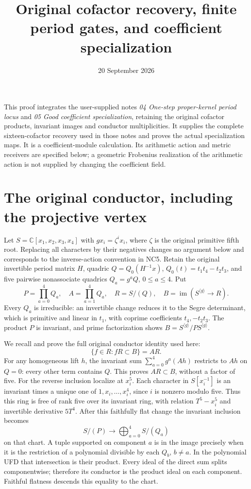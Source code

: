 \documentclass[11pt]{article}
\title{Original cofactor recovery, finite period gates, and coefficient specialization}
\author{}
\date{20 September 2026}
\newcommand{\C}{\mathbb C}
\newcommand{\im}{\operatorname{im}}
\begin{document}
\maketitle
This proof integrates the user-supplied notes
\emph{04 One-step proper-kernel period locus} and
\emph{05 Good coefficient specialization}, retaining the original
cofactor products, invariant images and conductor multiplicities.
It supplies the complete sixteen-cofactor recovery used in those notes
and proves the actual specialization maps. It is a coefficient-module
calculation. Its arithmetic action and metric receivers are specified
below; a geometric Frobenius realization of the arithmetic action is
not supplied by changing the coefficient field.

\section{The original conductor, including the projective vertex}
Let $S=\C[x_1,x_2,x_3,x_4]$ with
$g x_i=\zeta^i x_i$, where $\zeta$ is the original primitive fifth
root. Replacing all characters by their negatives changes no argument
below and corresponds to the inverse-action convention in NC5.
Retain the original invertible period matrix $H$, quadric
$Q=Q_0(H^{-1}x)$, $Q_0(t)=t_1t_4-t_2t_3$, and five pairwise
nonassociate quadrics $Q_a=g^aQ$, $0\le a\le4$. Put
\[
 P=\prod_{a=0}^4Q_a,\quad A=\prod_{a=1}^4Q_a,\quad
 R=S/(Q),\quad B=\im(S^{\langle g\rangle}\to R).
                                                                    \tag{CP1}
\]
Every $Q_a$ is irreducible: an invertible change reduces it to the
Segre determinant, which is primitive and linear in $t_1$, with
coprime coefficients $t_4,-t_2t_3$. The product $P$ is invariant,
and prime factorization shows
$B=S^{\langle g\rangle}/P S^{\langle g\rangle}$.

We recall and prove the full original conductor identity used here:
\[
 \{f\in R:fR\subset B\}=AR.                                      \tag{CP2}
\]
For any homogeneous lift $h$, the invariant sum
$\sum_{a=0}^4g^a(Ah)$ restricts to $Ah$ on $Q=0$: every other
term contains $Q$. This proves $AR\subset B$, without a factor
of five. For the reverse inclusion localize at $x_i^5$. Each
character in $S[x_i^{-1}]$ is an invariant times a unique one
of $1,x_i,\ldots,x_i^4$, since $i$ is nonzero modulo five.
Thus this ring is free of rank five over its invariant ring,
with relation $T^5-x_i^5$ and invertible derivative $5T^4$.
After this faithfully flat change the invariant inclusion becomes
\[
 S/(P)\longrightarrow\bigoplus_{a=0}^4 S/(Q_a)                    \tag{CP3}
\]
on that chart. A tuple supported on component $a$ is in the image
precisely when it is the restriction of a polynomial divisible by
each $Q_b$, $b\ne a$. In the polynomial UFD that intersection
is their product. Every ideal of the direct sum splits componentwise;
therefore its conductor is the product ideal on each component.
Faithful flatness descends this equality to the chart.
\end{document}
